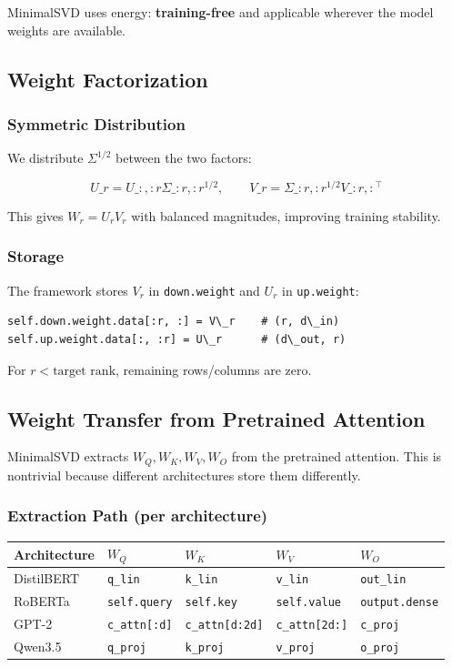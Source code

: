 MinimalSVD uses energy: \textbf{training-free} and applicable wherever the model 
weights are available.

\subsection{Weight Factorization}

\subsubsection{Symmetric Distribution}

We distribute $\Sigma^{1/2}$ between the two factors:

\[
U\_r = U\_{:, :r} \Sigma\_{:r, :r}^{1/2}, \qquad
V\_r = \Sigma\_{:r, :r}^{1/2} V\_{:r, :}^\top
\tag{4.6}
\]

This gives $W_r = U_r V_r$ with balanced magnitudes, improving training 
stability.

\subsubsection{Storage}

The framework stores $V_r$ in \texttt{down.weight} and $U_r$ in \texttt{up.weight}:

\begin{lstlisting}
self.down.weight.data[:r, :] = V\_r    # (r, d\_in)
self.up.weight.data[:, :r] = U\_r      # (d\_out, r)
\end{lstlisting}

For $r < \text{target rank}$, remaining rows/columns are zero.

\subsection{Weight Transfer from Pretrained Attention}

MinimalSVD extracts $W_Q, W_K, W_V, W_O$ from the pretrained attention. This 
is nontrivial because different architectures store them differently.

\subsubsection{Extraction Path (per architecture)}

\begin{table}[H]
\centering
\small
\begin{tabular}{lllll}
\toprule
\textbf{Architecture} & \textbf{$W_Q$} & \textbf{$W_K$} & \textbf{$W_V$} & \textbf{$W_O$} \\
\midrule
DistilBERT & \texttt{q\_lin} & \texttt{k\_lin} & \texttt{v\_lin} & \texttt{out\_lin} \\
RoBERTa & \texttt{self.query} & \texttt{self.key} & \texttt{self.value} & \texttt{output.dense} \\
GPT-2 & \texttt{c\_attn[:d]} & \texttt{c\_attn[d:2d]} & \texttt{c\_attn[2d:]} & \texttt{c\_proj} \\
Qwen3.5 & \texttt{q\_proj} & \texttt{k\_proj} & \texttt{v\_proj} & \texttt{o\_proj} \\
\bottomrule
\end{tabular}
\end{table}


